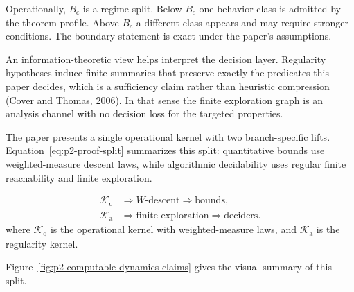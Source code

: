 \documentclass[a4paper,10pt,twocolumn,english]{article}
\numberwithin{equation}{section}
\theoremstyle{paperdef}
\theoremstyle{paperplain}
\theoremstyle{paperdef}
\theoremstyle{paperremark}
\newcommand{\Bc}{\ensuremath{B_c}}
\begin{document}
Operationally, $\Bc$ is a regime split. Below $\Bc$ one behavior class is admitted by the theorem
profile. Above $\Bc$ a different class appears and may require stronger conditions. The boundary
statement is exact under the paper's assumptions.

An information-theoretic view helps interpret the decision layer. Regularity hypotheses induce
finite summaries that preserve exactly the predicates this paper decides, which is a sufficiency
claim rather than heuristic compression (Cover and Thomas, 2006). In that sense the finite
exploration graph is an analysis channel with no decision loss for the targeted properties.

The paper presents a single operational kernel with two branch-specific lifts. Equation~\ref{eq:p2-proof-split} summarizes this split: quantitative bounds use weighted-measure descent laws, while algorithmic decidability uses regular finite reachability and finite exploration.

\begingroup
\setlength{\abovedisplayskip}{3pt}
\setlength{\abovedisplayshortskip}{3pt}
\begin{equation}
	\label{eq:p2-proof-split}
	\begin{aligned}
		\mathcal{K}_{\mathrm{q}} & \Longrightarrow W\text{-descent}
		\Longrightarrow \text{bounds},                                       \\
		\mathcal{K}_{\mathrm{a}} & \Longrightarrow \text{finite exploration}
		\Longrightarrow \text{deciders}.
	\end{aligned}
\end{equation}
\noindent where $\mathcal{K}_{\mathrm{q}}$ is the operational kernel with weighted-measure laws,
and $\mathcal{K}_{\mathrm{a}}$ is the regularity kernel.
\endgroup

Figure~\ref{fig:p2-computable-dynamics-claims} gives the visual summary of this split.
\end{document}
